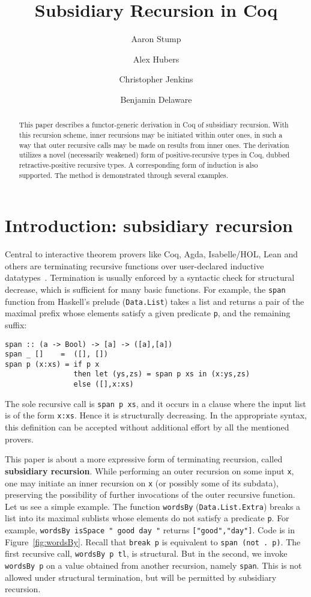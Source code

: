 \documentclass[a4paper,USenglish]{lipics-v2021}
\title{Subsidiary Recursion in Coq} %
\author{Aaron Stump}{Computer Science Dept., The University of Iowa, USA \and \url{http://www.cs.uiowa.edu/~astump/}}{aaron-stump@uiowa.edu}{http://orcid.org/0000-0002-9720-0003}{}%
\author{Alex Hubers}{Computer Science, The University of Iowa, USA}{alexander-hubers@uiowa.edu}{}{}
\author{Christopher Jenkins}{Computer Science, The University of Iowa, USA}{alexander-hubers@uiowa.edu}{http://orcid.org/
0000-0002-5434-5018}{}
\author{Benjamin Delaware}{Computer Science, Purdue University, USA \and \url{https://www.cs.purdue.edu/homes/bendy/}}{bendy@purdue.edu}{}{}
\begin{document}
\maketitle

\begin{abstract}
  This paper describes a functor-generic derivation in Coq of
  subsidiary recursion.  With this recursion scheme, inner recursions
  may be initiated within outer ones, in such a way that outer
  recursive calls may be made on results from inner ones.  The
  derivation utilizes a novel (necessarily weakened) form of
  positive-recursive types in Coq, dubbed retractive-positive
  recursive types.  A corresponding form of induction is also
  supported.  The method is demonstrated through several examples.
\end{abstract}

\section{Introduction: subsidiary recursion}
\label{sec:intro}

Central to interactive theorem provers like Coq, Agda, Isabelle/HOL,
Lean and others are terminating recursive functions over user-declared
inductive datatypes~\cite{agda,coq,isabelle-hol,lean}.  Termination is
usually enforced by a syntactic check for structural decrease, which
is sufficient for many basic functions.  For example, the
\texttt{span} function from Haskell's prelude (\verb|Data.List|) takes
a list and returns a pair of the maximal prefix whose elements satisfy
a given predicate \verb|p|, and the remaining suffix:
\begin{verbatim}
span :: (a -> Bool) -> [a] -> ([a],[a])
span _ []    =  ([], [])
span p (x:xs) = if p x
                then let (ys,zs) = span p xs in (x:ys,zs)
                else ([],x:xs)
\end{verbatim}
\noindent The sole recursive call is \verb|span p xs|, and it occurs
in a clause where the input list is of the form \verb|x:xs|.  Hence it
is structurally decreasing.  In the appropriate syntax, this
definition can be accepted without additional effort by all the
mentioned provers.

This paper is about a more expressive form of terminating recursion,
called \textbf{subsidiary recursion}.  While performing an outer
recursion on some input \verb|x|, one may initiate an inner recursion
on \verb|x| (or possibly some of its subdata), preserving the
possibility of further invocations of the outer recursive function.
Let us see a simple example.  The function \verb|wordsBy|
(\verb|Data.List.Extra|) breaks a list into its maximal sublists whose
elements do not satisfy a predicate \verb|p|.  For example,
\verb|wordsBy isSpace " good day "| returns \verb|["good","day"]|.
Code is in Figure~\ref{fig:wordsBy}.  Recall that
\verb|break p| is equivalent to \verb|span (not . p)|. The first recursive call,
\verb|wordsBy p tl|, is structural.  But in the second, we invoke
\verb|wordsBy p| on a value obtained from another recursion, namely
\verb|span|.  This is not allowed under structural termination, but
will be permitted by subsidiary recursion.
\end{document}
